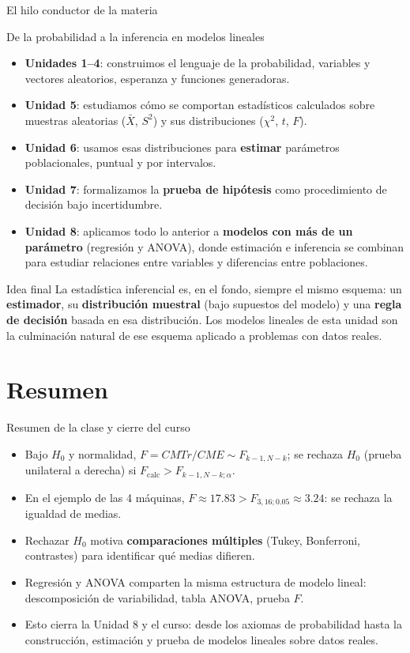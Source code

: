 \documentclass[aspectratio=169,11pt]{beamer}
\begin{document}
\begin{frame}{El hilo conductor de la materia}
\begin{block}{De la probabilidad a la inferencia en modelos lineales}
\begin{itemize}
\item \textbf{Unidades 1--4}: construimos el lenguaje de la probabilidad, variables y vectores aleatorios, esperanza y funciones generadoras.
\item \textbf{Unidad 5}: estudiamos cómo se comportan estadísticos calculados sobre muestras aleatorias ($\bar X$, $S^2$) y sus distribuciones ($\chi^2$, $t$, $F$).
\item \textbf{Unidad 6}: usamos esas distribuciones para \textbf{estimar} parámetros poblacionales, puntual y por intervalos.
\item \textbf{Unidad 7}: formalizamos la \textbf{prueba de hipótesis} como procedimiento de decisión bajo incertidumbre.
\item \textbf{Unidad 8}: aplicamos todo lo anterior a \textbf{modelos con más de un parámetro} (regresión y ANOVA), donde estimación e inferencia se combinan para estudiar relaciones entre variables y diferencias entre poblaciones.
\end{itemize}
\end{block}

\begin{alertblock}{Idea final}
La estadística inferencial es, en el fondo, siempre el mismo esquema: un \textbf{estimador}, su \textbf{distribución muestral} (bajo supuestos del modelo) y una \textbf{regla de decisión} basada en esa distribución. Los modelos lineales de esta unidad son la culminación natural de ese esquema aplicado a problemas con datos reales.
\end{alertblock}
\end{frame}

\section{Resumen}

\begin{frame}{Resumen de la clase y cierre del curso}
\begin{itemize}
\item Bajo $H_0$ y normalidad, $F=CMTr/CME \sim F_{k-1,N-k}$; se rechaza $H_0$ (prueba unilateral a derecha) si $F_{\text{calc}}>F_{k-1,N-k;\alpha}$.
\item En el ejemplo de las 4 máquinas, $F\approx17.83 > F_{3,16;0.05}\approx3.24$: se rechaza la igualdad de medias.
\item Rechazar $H_0$ motiva \textbf{comparaciones múltiples} (Tukey, Bonferroni, contrastes) para identificar qué medias difieren.
\item Regresión y ANOVA comparten la misma estructura de modelo lineal: descomposición de variabilidad, tabla ANOVA, prueba $F$.
\item Esto cierra la Unidad 8 y el curso: desde los axiomas de probabilidad hasta la construcción, estimación y prueba de modelos lineales sobre datos reales.
\end{itemize}
\end{frame}
\end{document}
